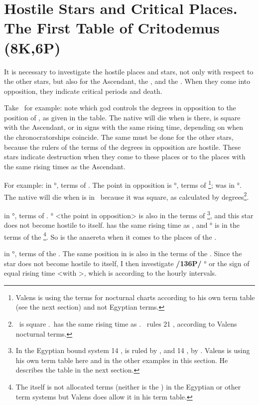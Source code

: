 \section{Hostile Stars and Critical Places. The First Table of Critodemus (8K,6P)}
It is necessary to investigate the hostile places and stars, not only with respect to the other stars, but also for the Ascendant, the \Sun, and the \Moon. When they come into opposition, they indicate critical periods and death. 

Take \Saturn\, for example: note which god controls the degrees in opposition to the position of \Saturn, as given in the table. The native will die when \Saturn\xspace is there, is square with the Ascendant, or in signs with the same rising time, depending on when the chronocratorships coincide. The same must be done for the other stars, because the rulers of the terms of the degrees in opposition are hostile. These stars indicate destruction when they come to these places or to the places with the same rising times as the Ascendant.

For example: \Saturn\xspace in \Cancer\xspace 21°, terms of \Venus. The point in opposition is \Capricorn\xspace 21°, terms
of \Mars\footnote{Valens is using the terms for nocturnal charts according to  his own term table (see the next section)  and not Egyptian terms.}; \Mars\xspace was in \Taurus\xspace 27°. The native will die when \Saturn\xspace is in \Virgo\, because it was square, as calculated by degrees\footnote{\Virgo\, is square \Sagittarius.\Sagittarius\, has the same rising time as \Cancer.  \Mars\, rules 21 \Virgo, according to Valens nocturnal terms.}.

\Jupiter\xspace in \Scorpio\xspace 14°, terms of \Saturn. \Taurus\xspace 14° <the point in opposition> is also in the terms of \Saturn\footnote{In the Egyptian bound system 14 \Scorpio, is ruled by \Mercury, and 14 \Taurus, by \Jupiter. Valens is using his own term table here and in the other examples in this section. He describes the table in the next section.}, and this star does not become hostile to itself. \Leo\xspace has the same rising time as \Scorpio, and \Leo\xspace 14° is in the terms of the \Sun\footnote{The \Sun\xspace itself is not allocated terms (neither is the \Moon) in the Egyptian or other term systems but Valens does allow it in his term table.}. So \Jupiter\xspace is the anaereta when it comes to the places of the \Sun.

\Mars\xspace in \Taurus\xspace 27°, terms of the \Sun. The same position in \Scorpio\xspace <the point in opposition> is also in the terms of the \Sun. Since the star does not become hostile to itself, I then investigate \textbf{/136P/} \Leo\xspace 27° or the sign of equal rising time <with \Taurus>, which is \Gemini\xspace according to the hourly intervals.

